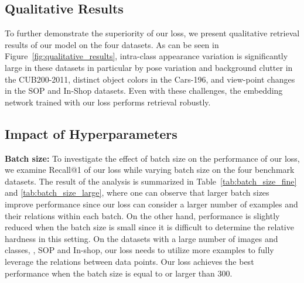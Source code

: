 \documentclass[10pt,twocolumn,letterpaper]{article}
\begin{document}
\subsection{Qualitative Results}
To further demonstrate the superiority of our loss, we present qualitative retrieval results of our model on the four datasets.
As can be seen in Figure~\ref{fig:qualitative_results}, intra-class appearance variation is significantly large in these datasets in particular by pose variation and background clutter in the CUB200-2011, distinct object colors in the Cars-196, and view-point changes in the SOP and In-Shop datasets.
Even with these challenges, the embedding network trained with our loss performs retrieval robustly.




\subsection{Impact of Hyperparameters}
\noindent \textbf{Batch size:} 
To investigate the effect of batch size on the performance of our loss, we examine Recall@1 of our loss while varying batch size on the four benchmark datasets.
The result of the analysis is summarized in Table~\ref{tab:batch_size_fine} and \ref{tab:batch_size_large}, where one can observe that larger batch sizes improve performance since our loss can consider a larger number of examples and their relations within each batch. 
On the other hand, performance is slightly reduced when the batch size is small since it is difficult to determine the relative hardness in this setting. 
On the datasets with a large number of images and classes, \ie, SOP and In-shop, our loss needs to utilize more examples to fully leverage the relations between data points. 
Our loss achieves the best performance when the batch size is equal to or larger than 300. 
\end{document}
